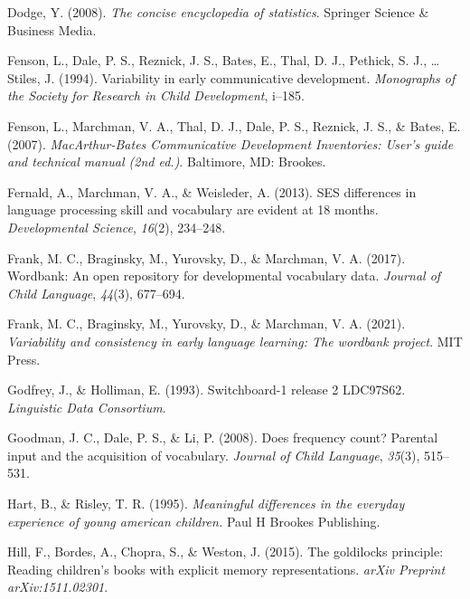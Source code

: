 \documentclass[10pt, letterpaper]{article}
\newenvironment{CSLReferences}%
  {}%
  {\par}
\begin{document}
\begin{CSLReferences}{1}{0}
\leavevmode{}%
Dodge, Y. (2008). \emph{The concise encyclopedia of statistics}.
Springer Science \& Business Media.

\leavevmode{}%
Fenson, L., Dale, P. S., Reznick, J. S., Bates, E., Thal, D. J.,
Pethick, S. J., \ldots{} Stiles, J. (1994). Variability in early
communicative development. \emph{Monographs of the Society for Research
in Child Development}, i--185.

\leavevmode{}%
Fenson, L., Marchman, V. A., Thal, D. J., Dale, P. S., Reznick, J. S.,
\& Bates, E. (2007). \emph{{M}ac{A}rthur-{B}ates {C}ommunicative
{D}evelopment {I}nventories: User's guide and technical manual (2nd
ed.)}. Baltimore, MD: Brookes.

\leavevmode{}%
Fernald, A., Marchman, V. A., \& Weisleder, A. (2013). SES differences
in language processing skill and vocabulary are evident at 18 months.
\emph{Developmental Science}, \emph{16}(2), 234--248.

\leavevmode{}%
Frank, M. C., Braginsky, M., Yurovsky, D., \& Marchman, V. A. (2017).
Wordbank: An open repository for developmental vocabulary data.
\emph{Journal of Child Language}, \emph{44}(3), 677--694.

\leavevmode{}%
Frank, M. C., Braginsky, M., Yurovsky, D., \& Marchman, V. A. (2021).
\emph{Variability and consistency in early language learning: The
wordbank project}. MIT Press.

\leavevmode{}%
Godfrey, J., \& Holliman, E. (1993). Switchboard-1 release 2 LDC97S62.
\emph{Linguistic Data Consortium}.

\leavevmode{}%
Goodman, J. C., Dale, P. S., \& Li, P. (2008). Does frequency count?
Parental input and the acquisition of vocabulary. \emph{Journal of Child
Language}, \emph{35}(3), 515--531.

\leavevmode{}%
Hart, B., \& Risley, T. R. (1995). \emph{Meaningful differences in the
everyday experience of young american children.} Paul H Brookes
Publishing.

\leavevmode{}%
Hill, F., Bordes, A., Chopra, S., \& Weston, J. (2015). The goldilocks
principle: Reading children's books with explicit memory
representations. \emph{arXiv Preprint arXiv:1511.02301}.


\end{CSLReferences}
\end{document}
